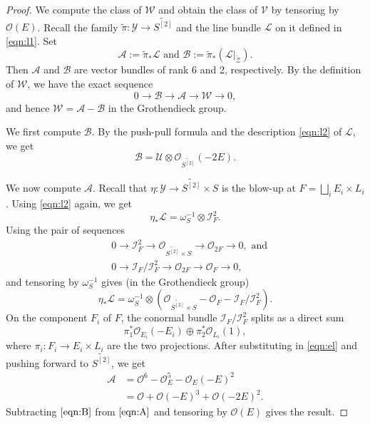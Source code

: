 \documentclass[11pt,reqno, letterpaper]{amsart}
\renewcommand{\to}{{\longrightarrow}}
\numberwithin{equation}{section}
\renewcommand{\O}{\mathcal O}
\newcommand{\td}{\widetilde}
\begin{document}
\begin{proof}
  We compute the class of $\mathcal W$ and obtain the class of $\mathcal V$ by tensoring by $\O(E)$.
  Recall the family $\widetilde \pi \colon \mathcal Y \to \widetilde{S^{[2]}}$ and the line bundle $\mathcal L$ on it defined in \eqref{eqn:l1}.
  Set
  \[ \mathcal A := \widetilde{\pi}_* \mathcal L \text{ and } \mathcal B := \widetilde{\pi}_* \left( \mathcal L|_{\widetilde{\mathcal Z}} \right).\]
  Then $\mathcal A$ and $\mathcal B$ are vector bundles of rank 6 and 2, respectively.
  By the definition of $\mathcal W$, we have the exact sequence
  \[ 0 \to \mathcal B \to \mathcal A \to \mathcal W \to 0,\]
  and hence $\mathcal W = \mathcal A - \mathcal B$ in the Grothendieck group.
  
  We first compute $\mathcal B$.
  By the push-pull formula and the description \eqref{eqn:l2} of $\mathcal L$, we get
  \begin{equation}\label{eqn:B}
    \mathcal B = \mathcal U \otimes \O_{\widetilde{S^{[2]}}}(-2E).
  \end{equation}
  
  We now compute $\mathcal A$.
  Recall that $\eta \colon \mathcal Y \to \widetilde{S^{[2]}} \times S$ is the blow-up at $F = \bigsqcup_i E_i \times L_i$.
  Using \eqref{eqn:l2} again, we get
  \[
    \eta_* \mathcal L = \omega_S^{-1} \otimes \mathcal I^2_{F}.
  \]
  Using the pair of sequences
  \begin{equation}
    \label{eq:seqA}
    \begin{split}
      &0 \to \mathcal{I}^2_{F} \to \O_{\td{S^{[2]}} \times S} \to \O_{2F} \to 0, \text{ and}\\
      &0 \to \mathcal{I}_{F}/\mathcal{I}_{F}^{2} \to \O_{2F} \to \O_{F} \to 0,
    \end{split}
  \end{equation}
  and tensoring by $\omega_S^{-1}$ gives (in the Grothendieck group)
  \begin{equation}\label{eqn:el}
    \eta_* \mathcal L = \omega_S^{-1} \otimes \left(\O_{\widetilde{S^{[2]}} \times S} - \O_F - \mathcal{I}_F / \mathcal{I}^2_F\right).
  \end{equation}
  On the component $F_i$ of $F$, the conormal bundle $\mathcal{I}_F / \mathcal{I}^2_F$ splits as a direct sum
  \[ \pi_1^*\O_{E_i}(-E_i) \oplus \pi_2^*\O_{L_i}(1),\]
  where $\pi_i \colon F_i \to E_i \times L_i$ are the two projections.
  After substituting in \eqref{eqn:el} and pushing forward to $\widetilde{S^{[2]}}$, we get
  \begin{equation}\label{eqn:A}
    \begin{split}
      \mathcal A &= \O^6- \O_E^{5}- \O_E(-E)^{2}\\
      &= \O + \O(-E)^3 + \O(-2E)^2.
    \end{split}
  \end{equation}
  Subtracting $\eqref{eqn:B}$ from $\eqref{eqn:A}$ and tensoring by $\O(E)$ gives the result.
\end{proof}
\end{document}
